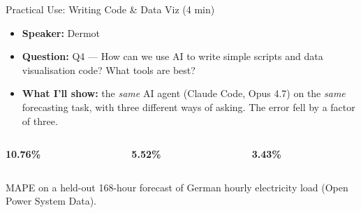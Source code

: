 \documentclass[aspectratio=169,11pt]{beamer}
\newcommand{\bignum}[3]{%
  \centering
  {\fontsize{40pt}{44pt}\selectfont\textbf{\textcolor{#1}{#2}}}\par
  \vspace{4pt}{\small\textbf{\textcolor{#1}{#3}}}\par
}
\begin{document}
\begin{frame}{Practical Use: Writing Code \& Data Viz (4 min)}
  \begin{itemize}
    \item \textbf{Speaker:} Dermot
    \item \textbf{Question:} Q4 --- How can we use AI to write simple scripts and
          data visualisation code? What tools are best?
    \item \textbf{What I'll show:} the \emph{same} AI agent (Claude Code, Opus 4.7)
          on the \emph{same} forecasting task, with three different ways of asking.
          The error fell by a factor of three.
  \end{itemize}
  \vspace{8pt}
  \begin{columns}[t,onlytextwidth]
    \begin{column}{0.32\textwidth}\bignum{l1grey}{10.76\%}{L1 --- beginner prompt}\end{column}
    \begin{column}{0.32\textwidth}\bignum{l2amber}{5.52\%}{L2 --- average user}\end{column}
    \begin{column}{0.32\textwidth}\bignum{l3orange}{3.43\%}{L3 --- research-grade prompt}\end{column}
  \end{columns}
  \vspace{8pt}
  \begin{center}\small
    MAPE on a held-out 168-hour forecast of German hourly electricity load
    (Open Power System Data).
  \end{center}
\end{frame}
\end{document}
